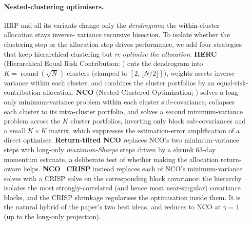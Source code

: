 \documentclass[11pt,a4paper]{article}
\begin{document}
\paragraph{Nested-clustering optimisers.} HRP and all its variants change
only the \emph{dendrogram}; the within-cluster allocation stays inverse-
variance recursive bisection. To isolate whether the clustering step or
the allocation step drives performance, we add four strategies that
keep hierarchical clustering but \emph{re-optimise the allocation}.
\textbf{HERC} (Hierarchical Equal Risk Contribution; \citealp{raffinot2018herc})
cuts the dendrogram into $K=\operatorname{round}(\sqrt{N})$ clusters (clamped to $[2,\lfloor N/2\rfloor]$), weights assets
inverse-variance within each cluster, and combines the cluster portfolios
by an equal-risk-contribution allocation. \textbf{NCO} (Nested Clustered
Optimization; \citealp{lopezdeprado2019nco}) solves a long-only
minimum-variance problem within each cluster sub-covariance, collapses
each cluster to its intra-cluster portfolio, and solves a second
minimum-variance problem across the $K$ cluster portfolios, inverting
only block sub-covariances and a small $K\times K$ matrix, which
suppresses the estimation-error amplification of a direct optimiser.
\textbf{Return-tilted NCO} replaces NCO's two minimum-variance steps with
long-only \emph{maximum-Sharpe} steps driven by a shrunk 63-day momentum
estimate, a deliberate test of whether making the allocation
return-aware helps. \textbf{NCO\_CRISP} instead replaces each of NCO's
minimum-variance solves with a CRISP solve on the corresponding block
covariance: the hierarchy isolates the most strongly-correlated (and
hence most near-singular) covariance blocks, and the CRISP shrinkage
regularises the optimisation inside them. It is the natural hybrid of
the paper's two best ideas, and reduces to NCO at $\gamma=1$ (up to the long-only projection).
\end{document}
